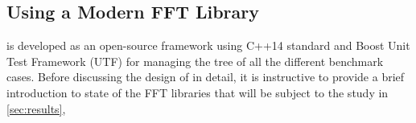 

\subsection{Using a Modern FFT Library}

\gearshifft{} is developed as an open-source framework using C++14 standard and Boost Unit Test Framework (UTF) for managing the tree of all the different benchmark cases.
Before discussing the design of \gearshifft{} in detail, it is instructive to provide a brief introduction to state of the FFT libraries that will be subject to the study in \cref{sec:results},

